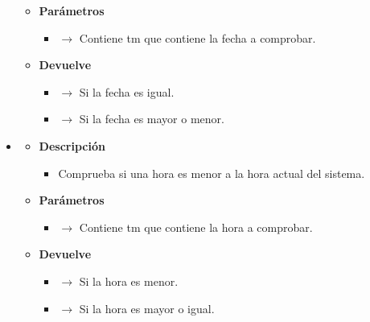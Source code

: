 \begin{itemize}
\begin{itemize}
\begin{itemize}
 		\end{itemize}
 		\item \textbf{Parámetros}
 		\begin{itemize}
 			\item {} $\rightarrow$ Contiene tm que contiene la fecha a comprobar.
 		\end{itemize}
         \item \textbf{Devuelve}
 		\begin{itemize}
 			\item {} $\rightarrow$ Si la fecha es igual.
             \item {} $\rightarrow$ Si la fecha es mayor o menor.
 		\end{itemize}
 	\end{itemize}
    \item {}
     \begin{itemize}
         \item \textbf{Descripción}
         \begin{itemize}
 			\item Comprueba si una hora es menor a la hora actual del sistema.
 		\end{itemize}
 		\item \textbf{Parámetros}
 		\begin{itemize}
 			\item {} $\rightarrow$ Contiene tm que contiene la hora a comprobar.
 		\end{itemize}
         \item \textbf{Devuelve}
 		\begin{itemize}
 			\item {} $\rightarrow$ Si la hora es menor.
             \item {} $\rightarrow$ Si la hora es mayor o igual.
 		\end{itemize}
 	\end{itemize}
\end{itemize}
\newpage
